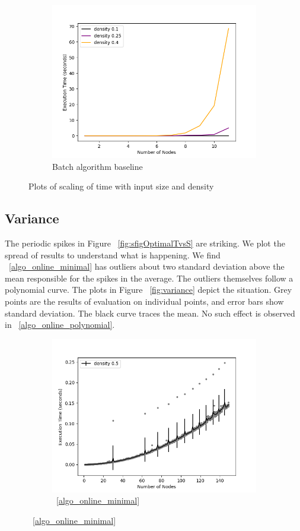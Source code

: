 \documentclass[sigplan,review,anonymous]{acmart}
\begin{document}
{\begin{figure}
    \begin{subfigure}{0.5\linewidth}
      \includegraphics[width=.8\linewidth]{timeVsSize_10_BatchChecker.png}
      \caption{Batch algorithm baseline}
      \label{fig:sfigBatchTvsS}
    \end{subfigure}
    \caption{Plots of scaling of time with input size and density}
    \label{fig:timeVsSize}
\end{figure}

\subsection{Variance}
The periodic spikes in Figure ~\ref{fig:sfigOptimalTvsS} are striking. 
We plot the spread of results to understand what is happening.
We find ~\ref{algo_online_minimal} has outliers about two standard deviation above the mean responsible for the spikes in the average.
The outliers themselves follow a polynomial curve.
The plots in Figure ~\ref{fig:variance} depict the situation.
Grey points are the results of evaluation on individual points, and error bars show standard deviation. 
The black curve traces the mean.
No such effect is observed in ~\ref{algo_online_polynomial}.
\begin{figure}
    \begin{subfigure}{0.5\linewidth}
      \includegraphics[width=.8\linewidth]{variance_10_OptimalSet.png}
      \caption{~\ref{algo_online_minimal}}
      \label{fig:sfigOptimalSpread}
    \end{subfigure}


\end{figure}}
\end{document}
